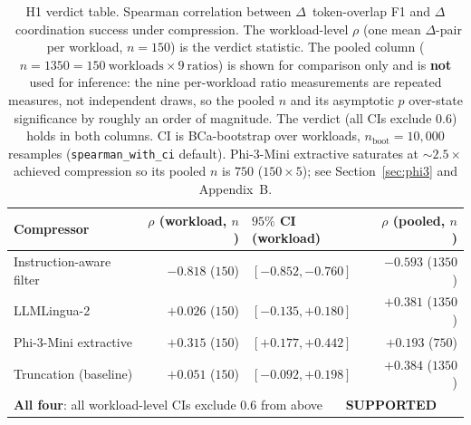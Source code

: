 \begin{table}[htbp]
\centering
\caption{H1 verdict table. Spearman correlation between
$\Delta$~token-overlap F1 and $\Delta$~coordination success under
compression. The workload-level $\rho$ (one mean $\Delta$-pair per
workload, $n=150$) is the verdict statistic. The pooled column
($n=1350 = 150~\text{workloads} \times 9~\text{ratios}$) is shown
for comparison only and is \textbf{not} used for inference: the
nine per-workload ratio measurements are repeated measures, not
independent draws, so the pooled $n$ and its asymptotic $p$
over-state significance by roughly an order of magnitude. The
verdict (all CIs exclude $0.6$) holds in both columns. CI is
BCa-bootstrap over workloads, $n_\text{boot}=10{,}000$ resamples
(\texttt{spearman\_with\_ci} default). Phi-3-Mini
extractive saturates at $\sim 2.5\times$ achieved compression so
its pooled $n$ is $750$ ($150 \times 5$); see
Section~\ref{sec:phi3} and Appendix~B.}
\label{tab:h1_rho}
\small
\begin{tabular}{p{3.4cm}rlr}
\hline
Compressor & $\rho$ (workload, $n$) & $95\%$ CI (workload) & $\rho$ (pooled, $n$) \\
\hline
Instruction-aware filter & $-0.818$ ($150$) & $[-0.852, -0.760]$ & $-0.593$ ($1350$) \\
LLMLingua-2              & $+0.026$ ($150$) & $[-0.135, +0.180]$ & $+0.381$ ($1350$) \\
Phi-3-Mini extractive    & $+0.315$ ($150$) & $[+0.177, +0.442]$ & $+0.193$ ($750$) \\
Truncation (baseline)    & $+0.051$ ($150$) & $[-0.092, +0.198]$ & $+0.384$ ($1350$) \\
\hline
\multicolumn{4}{l}{\textbf{All four}: all workload-level CIs exclude $0.6$ from above ~~~\textbf{SUPPORTED}} \\
\hline
\end{tabular}
\end{table}

